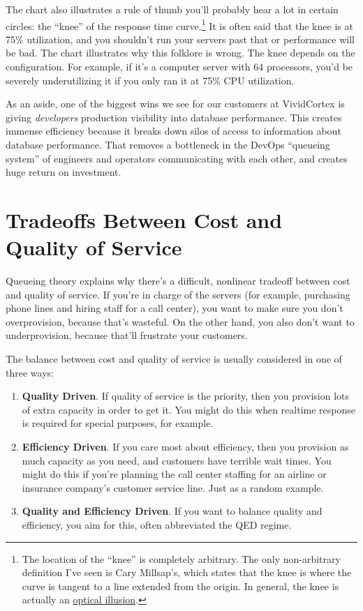 \documentclass{vivid_layout_pdf}
\begin{document}
The chart also illustrates a rule of thumb you'll probably hear a lot in certain circles: the ``knee'' of the response time curve.\footnote{The location of the ``knee'' is completely arbitrary. The only non-arbitrary definition I've seen is Cary Millsap's, which states that the knee is where the curve is tangent to a line extended from the origin. In general, the knee is actually an \href{http://perfdynamics.blogspot.com/2008/03/watching-your-knees-and-queues.html}{optical illusion}.} It is often said that the knee is at 75\% utilization, and you shouldn't run your servers past that or performance will be bad. The chart illustrates why this folklore is wrong. The knee depends on the configuration. For example, if it's a computer server with 64 processors, you'd be severely underutilizing it if you only ran it at 75\% CPU utilization.

As an aside, one of the biggest wins we see for our customers at VividCortex is giving {\itshape developers} production visibility into database performance. This creates immense efficiency because it breaks down silos of access to information about database performance. That removes a bottleneck in the DevOps ``queueing system'' of engineers and operators communicating with each other, and creates huge return on investment.

\section{Tradeoffs Between Cost and Quality of Service}

Queueing theory explains why there's a difficult, nonlinear tradeoff between
cost and quality of service. If you're in charge of the servers (for example,
purchasing phone lines and hiring staff for a call center), you want to make
sure you don't overprovision, because that's wasteful. On the other hand, you
also don't want to underprovision, because that'll frustrate your customers.

The balance between cost and quality of service is usually considered in one of
three ways:

\begin{enumerate}
\item {\bfseries Quality Driven}. If quality of service is the priority, then
you provision lots of extra capacity in order to get it. You might do this when
realtime response is required for special purposes, for example.
\item {\bfseries Efficiency Driven}. If you care most about efficiency, then you
provision as much capacity as you need, and customers have terrible wait times.
You might do this if you're planning the call center staffing for an airline or
insurance company's customer service line. Just as a random example.
\item {\bfseries Quality and Efficiency Driven}. If you want to balance quality
and efficiency, you aim for this, often abbreviated the QED regime.
\end{enumerate}
\end{document}
